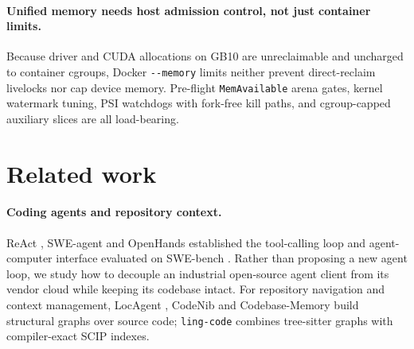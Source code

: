 \documentclass[11pt]{article}
\newcommand{\code}[1]{\texttt{#1}}
\begin{document}
\paragraph{Unified memory needs host admission control, not just container limits.} Because driver
and CUDA allocations on GB10 are unreclaimable and uncharged to container cgroups, Docker
\code{-{}-memory} limits neither prevent direct-reclaim livelocks nor cap device memory. Pre-flight
\code{MemAvailable} arena gates, kernel watermark tuning, PSI watchdogs with fork-free kill paths,
and cgroup-capped auxiliary slices are all load-bearing.

\section{Related work}

\paragraph{Coding agents and repository context.} ReAct \cite{yao2023react}, SWE-agent
\cite{yang2024sweagent} and OpenHands \cite{wang2024openhands} established the tool-calling loop
and agent-computer interface evaluated on SWE-bench \cite{jimenez2024swebench,swebenchexperiments}.
Rather than proposing a new agent loop, we study how to decouple an industrial open-source agent
client \cite{openai2026codex} from its vendor cloud while keeping its codebase intact. For
repository navigation and context management, LocAgent \cite{chen2025locagent}, CodeNib
\cite{yu2026codenib} and Codebase-Memory \cite{vogel2026codebasememory,codebasememorymcp} build
structural graphs over source code; \code{ling-code} combines tree-sitter \cite{treesitter} graphs
with compiler-exact SCIP \cite{scip} indexes.
\end{document}
